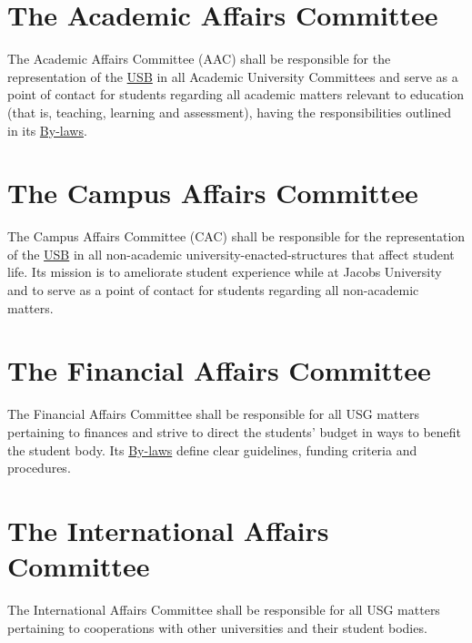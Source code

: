 \section{The Academic Affairs Committee}
\label{AACdef}
The Academic Affairs Committee (AAC) shall be responsible for the representation of the \hyperref[studentbody]{USB} in all Academic University Committees and serve as a point of contact for students regarding all academic matters relevant to education (that is, teaching, learning and assessment), having the responsibilities outlined in its  \hyperref[AACByLawsdef]{By-laws}.


\section{The Campus Affairs Committee} 
\label{CACdef}
The Campus Affairs Committee (CAC) shall be responsible for the representation of the \hyperref[studentbody]{USB} in all non-academic university-enacted-structures that affect student life. Its mission is to ameliorate student experience while at Jacobs University and to serve as a point of contact for students regarding all non-academic matters.

\section{The Financial Affairs Committee}
\label{Financesdef}
The Financial Affairs Committee shall be responsible for all USG matters pertaining to finances and strive to direct the students' budget in ways to benefit the student body. Its \hyperref[FinByLawsdef]{By-laws} define clear guidelines, funding criteria and procedures.

\section{The International Affairs Committee}
\label{IACdef}
The International Affairs Committee shall be responsible for all USG matters pertaining to cooperations with other universities and their student bodies. 